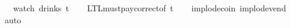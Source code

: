 \begin{isabellebody}
{\ \ \ {\isacharparenleft}watch\ drinks\ t{\isacharparenright}{\isachardoublequoteclose}%
}%
%
\isadelimproof
\ \ %
\endisadelimproof
%
\isatagproof
{}\isamarkupfalse%
\ LTL{\isacharunderscore}must{\isacharunderscore}pay{\isacharunderscore}correct{\isacharbrackleft}of\ t{\isacharbrackright}\isanewline
\ \ \isamarkupfalse%
\ implode{\isacharunderscore}coin\ implode{\isacharunderscore}vend\ \isamarkupfalse%
\ auto%
\endisatagproof
{\isafoldproof}%
%
\isadelimproof
%
\endisadelimproof
\isanewline
%
\isadelimtheory
\isanewline
%
\endisadelimtheory
%
\isatagtheory
{}\isamarkupfalse%
%
\endisatagtheory
{\isafoldtheory}%
%
\isadelimtheory
%
\endisadelimtheory
%
\end{isabellebody}%
\endinput
